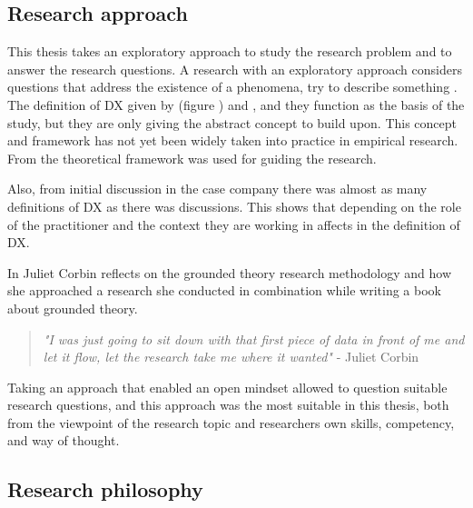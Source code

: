 \documentclass[english, 12pt, a4paper, sci, utf8, a-1b, online]{aaltothesis}
\begin{document}
\subsection{Research approach}

This thesis takes an exploratory approach to study the research problem and to answer the research questions. A research with an exploratory approach considers questions that address the existence of a phenomena, try to describe something \parencite{easterbrook2008selecting}. The definition of DX given by \textcite{fagerholm-dx-concept-and-definition} (figure ) and \textcite{fagerholm-doctoral-thesis}, and they function as the basis of the study, but they are only giving the abstract concept to build upon. This concept and framework has not yet been widely taken into practice in empirical research. From \textcite{fagerholm-doctoral-thesis} the theoretical framework was used for guiding the research. 

Also, from initial discussion in the case company there was almost as many definitions of DX as there was discussions. This shows that depending on the role of the practitioner and the context they are working in affects in the definition of DX.

In \textcite{developing-grounded-theory} Juliet Corbin reflects on the grounded theory research methodology and how she approached a research she conducted in combination while writing a book \parencite{basics-of-qualitative-research} about grounded theory.

\begin{quotation}
  \textit{"I was just going to sit down with that first piece of data in front of me and let it flow, let the research take me where it wanted"} - Juliet Corbin \parencite[p.~43]{developing-grounded-theory}
\end{quotation}

Taking an approach that enabled an open mindset allowed to question suitable research questions, and this approach was the most suitable in this thesis, both from the viewpoint of the research topic and researchers own skills, competency, and way of thought.


\subsection{Research philosophy} \label{section:research-philosophy}
\end{document}
